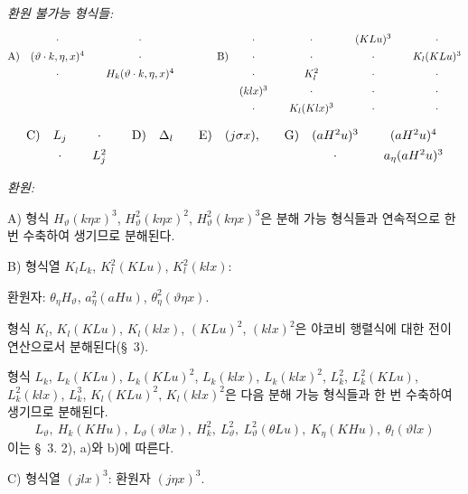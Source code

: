 \noindent\emph{환원 불가능 형식들:}
\[
\renewcommand{\arraystretch}{1.35}
\begin{array}{@{}r@{\quad}c@{\qquad}c@{\qquad\qquad}r@{\quad}c@{\qquad}c@{\qquad}c@{\qquad}c@{}}
&\cdot&\cdot&&\cdot&\cdot&(KLu)^3&\cdot\\
\text{A)}&(\vartheta\cdot k,\eta,x)^4&\cdot&\text{B)}&\cdot&\cdot&\cdot&K_l(KLu)^3\\
&\cdot&H_k(\vartheta\cdot k,\eta,x)^4&&\cdot&K_l^2&\cdot&\cdot\\
&&&& (klx)^3&\cdot&\cdot&\cdot\\
&&&&\cdot&K_l(Klx)^3&\cdot&\cdot
\end{array}
\]
\[
\renewcommand{\arraystretch}{1.35}
\begin{array}{@{}r@{\quad}c@{\qquad}c@{\qquad}r@{\quad}c@{\qquad}r@{\quad}c@{\qquad}r@{\quad}c@{\qquad}c@{}}
\text{C)}&L_j&\cdot&\text{D)}&\A_l&\text{E)}&(j\sigma x),&\text{G)}&(aH^2u)^3&(aH^2u)^4\\
&\cdot&L_j^2&&&&&&\cdot&a_\eta(aH^2u)^3
\end{array}
\]

\noindent\emph{환원:}

A) 형식 $H_\vartheta(k\eta x)^3$, $H_\vartheta^2(k\eta x)^2$, $H_\vartheta^2(k\eta x)^3$은 분해 가능 형식들과 연속적으로 한 번 수축하여 생기므로 분해된다.

B) 형식열 $K_lL_k$, $K_l^2(KLu)$, $K_l^2(klx)$:

환원자: $\theta_\eta H_\vartheta$, $a_\eta^2(aHu)$, $\theta_\eta^2(\vartheta\eta x)$.

형식 $K_l$, $K_l(KLu)$, $K_l(klx)$, $(KLu)^2$, $(klx)^2$은 야코비 행렬식에 대한 전이연산으로서 분해된다(\S\ 3).

형식 $L_k$, $L_k(KLu)$, $L_k(KLu)^2$, $L_k(klx)$, $L_k(klx)^2$, $L_k^2$, $L_k^2(KLu)$, $L_k^2(klx)$, $L_k^3$, $K_l(KLu)^2$, $K_l(klx)^2$은 다음 분해 가능 형식들과 한 번 수축하여 생기므로 분해된다.
\[
L_\vartheta,
\ H_k(KHu),
\ L_\vartheta(\vartheta lx),
\ H_k^2,
\ L_\vartheta^2,
\ L_\vartheta^2(\theta Lu),
\ K_\eta(KHu),
\ \theta_l(\vartheta lx)
\]
이는 \S\ 3. 2), a)와 b)에 따른다.

C) 형식열 $(jlx)^3$: 환원자 $(j\eta x)^3$.

